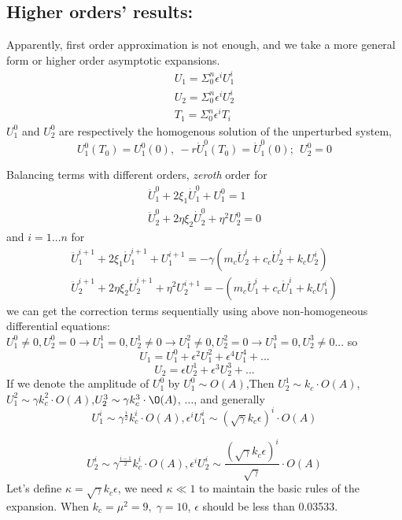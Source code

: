 \documentclass{article}
\begin{document}
\subsection{Higher orders' results:}
Apparently, first order approximation is not enough, and we take a more general form or higher order asymptotic expansions.
\begin{align}
U_1=\Sigma_0^n \epsilon^{i}U_1^{i}\\
U_2=\Sigma_0^n \epsilon^{i}U_2^{i}\\
T_1=\Sigma_0^n \epsilon^{i}T_{i}
\end{align}
%
$U_1^0$ and $U_2^0$ are respectively the homogenous solution of the unperturbed system,
\begin{equation}
U_1^0(T_0) = U_1^0(0),~ -r\dot{U}_1^0(T_0) = \dot{U}_1^0(0);~~U_2^0=0 \label{eq:unperturbed reset map}
\end{equation}

Balancing terms with different orders, \emph{zeroth} order for 
\begin{align}
\ddot{U}_1^{0}+2 \xi_1 \dot{U}_1^{0}+U_1^{0}=1\\
\ddot{U}_2^{0}+2 \eta \xi_2 \dot{U}_2^{0}+\eta^2 U_2^{0}= 0
\end{align}
and $i=1 \ldots n$ for
\begin{align}
    \ddot{U}_1^{i+1}+2 \xi_1 \dot{U}_1^{i+1}+U_1^{i+1}=- \gamma (m_c \ddot{U}_2^i+c_c \dot{U}_2^i+k_c U_2^i)\\
    \ddot{U}_2^{i+1}+2 \eta \xi_2 \dot{U}_2^{i+1}+\eta^2 U_2^{i+1}= -(m_c \ddot{U}_1^i+c_c \dot{U}_1^i+k_c U_1^i)
\end{align}
we can get the correction terms sequentially using above non-homogeneous differential equations: $U_1^0\neq0, U_2^0=0 \rightarrow U_1^1=0 ,U_2^1\neq0 \rightarrow U_1^2\neq0 ,U_2^2=0\rightarrow U_1^3=0, U_2^3\neq0... $
so \[\boxed{ U_1=U_1^0 + \epsilon^2 U_1^2 + \epsilon^4 U_1^4+...}\]
\[\boxed {U_2=\epsilon U_2^1+\epsilon^3 U_2^3 +...}\]
If we denote the amplitude of $U_1^0$ by $U_1^0 \sim O(A)$,Then $U_2^1 \sim k_c \cdot O(A)$, $U_1^2 \sim \gamma k_c^2 \cdot O(A)$,$U_2^3 \sim \gamma k_c^3 \cdot \O(A)$, $\ldots$, and generally $$U_1^i \sim \gamma^ {\frac{i}{2}} k_c^{i} \cdot O(A), \epsilon^i U_1^i \sim (\sqrt{\gamma} k_c \epsilon)^i \cdot O(A)$$

 $$U_2^i \sim \gamma^ {\frac{i-1}{2}} k_c^{i} \cdot O(A), \epsilon^i U_2^i \sim \frac{( \sqrt{\gamma} k_c \epsilon)^i}{\sqrt{\gamma}} \cdot O(A)$$
Let's define $\kappa = \sqrt{\gamma} k_c \epsilon$, we need $ \kappa \ll 1$ to maintain the basic rules of the expansion. When $k_c=\mu^2=9,\; \gamma = 10$, $\epsilon$ should be less than 0.03533.
\end{document}
